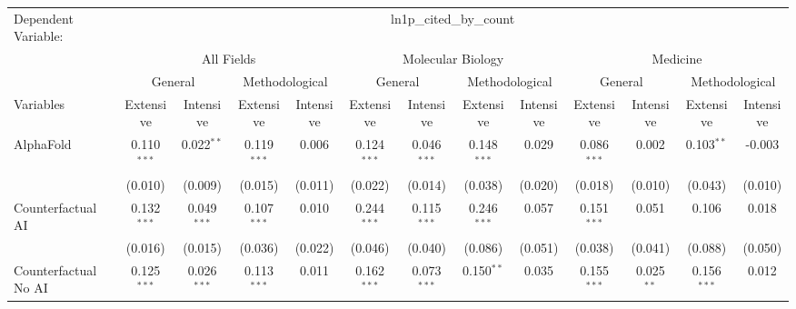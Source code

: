 \begingroup
\centering
\begin{tabular}{lcccccccccccc}
   \tabularnewline \midrule \midrule
   Dependent Variable: & \multicolumn{12}{c}{ln1p\_cited\_by\_count}\\
 & \multicolumn{4}{c}{All Fields} & \multicolumn{4}{c}{Molecular Biology} & \multicolumn{4}{c}{Medicine} \\
\cmidrule(lr){2-5} \cmidrule(lr){6-9} \cmidrule(lr){10-13}
 & \multicolumn{2}{c}{General} & \multicolumn{2}{c}{Methodological} & \multicolumn{2}{c}{General} & \multicolumn{2}{c}{Methodological} & \multicolumn{2}{c}{General} & \multicolumn{2}{c}{Methodological} \\
\cmidrule(lr){2-3} \cmidrule(lr){4-5} \cmidrule(lr){6-7} \cmidrule(lr){8-9} \cmidrule(lr){10-11} \cmidrule(lr){12-13}
Variables & \multicolumn{1}{c}{Extensive} & \multicolumn{1}{c}{Intensive} & \multicolumn{1}{c}{Extensive} & \multicolumn{1}{c}{Intensive} & \multicolumn{1}{c}{Extensive} & \multicolumn{1}{c}{Intensive} & \multicolumn{1}{c}{Extensive} & \multicolumn{1}{c}{Intensive} & \multicolumn{1}{c}{Extensive} & \multicolumn{1}{c}{Intensive} & \multicolumn{1}{c}{Extensive} & \multicolumn{1}{c}{Intensive} \\
\cmidrule(lr){1-1}\cmidrule(lr){2-2} \cmidrule(lr){3-3} \cmidrule(lr){4-4} \cmidrule(lr){5-5} \cmidrule(lr){6-6} \cmidrule(lr){7-7} \cmidrule(lr){8-8} \cmidrule(lr){9-9} \cmidrule(lr){10-10} \cmidrule(lr){11-11} \cmidrule(lr){12-12} \cmidrule(lr){13-13}
   AlphaFold                                & 0.110$^{***}$  & 0.022$^{**}$  & 0.119$^{***}$  & 0.006   & 0.124$^{***}$  & 0.046$^{***}$  & 0.148$^{***}$ & 0.029          & 0.086$^{***}$  & 0.002        & 0.103$^{**}$  & -0.003\\   
                                            & (0.010)        & (0.009)       & (0.015)        & (0.011) & (0.022)        & (0.014)        & (0.038)       & (0.020)        & (0.018)        & (0.010)      & (0.043)       & (0.010)\\   
   Counterfactual AI                        & 0.132$^{***}$  & 0.049$^{***}$ & 0.107$^{***}$  & 0.010   & 0.244$^{***}$  & 0.115$^{***}$  & 0.246$^{***}$ & 0.057          & 0.151$^{***}$  & 0.051        & 0.106         & 0.018\\   
                                            & (0.016)        & (0.015)       & (0.036)        & (0.022) & (0.046)        & (0.040)        & (0.086)       & (0.051)        & (0.038)        & (0.041)      & (0.088)       & (0.050)\\   
   Counterfactual No AI                     & 0.125$^{***}$  & 0.026$^{***}$ & 0.113$^{***}$  & 0.011   & 0.162$^{***}$  & 0.073$^{***}$  & 0.150$^{**}$  & 0.035          & 0.155$^{***}$  & 0.025$^{**}$ & 0.156$^{***}$ & 0.012\\   

\end{tabular}
